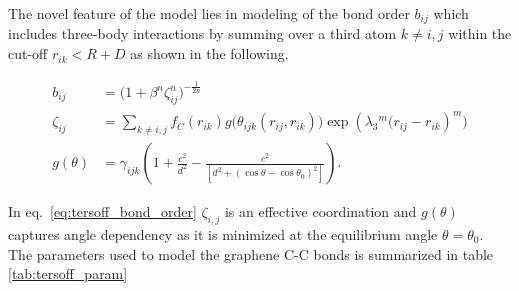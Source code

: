 The novel feature of the model lies in modeling of the bond order $b_{ij}$ which includes three-body interactions by summing over a third atom $k \ne i,j$ within the cut-off $r_{ik} < R + D$ as shown in the following.

\begin{align}
  b_{i j} & =\big(1+\beta^n \zeta_{i j}^n\big)^{-\frac{1}{2 n}} \\
  \zeta_{i j} & =\sum_{k \ne i,j} f_C(r_{i k}) g\Big(\theta_{i j k}\left(r_{i j}, r_{i k}\right)\Big) \exp \left(\lambda_3{ }^m\big(r_{i j}-r_{i k}\right)^m\big) \\
  g(\theta) & =\gamma_{i j k}\left(1+\frac{c^2}{d^2}-\frac{c^2}{\left[d^2+\left(\cos \theta-\cos \theta_0\right)^2\right]}\right).
  \label{eq:tersoff_bond_order}
\end{align}

In eq.~\eqref{eq:tersoff_bond_order} $\zeta_{i,j}$ is an effective coordination and $g(\theta)$ captures angle dependency as it is minimized at the equilibrium angle $\theta = \theta_0$. \\
The parameters used to model the graphene C-C bonds is summarized in table \ref{tab:tersoff_param}




